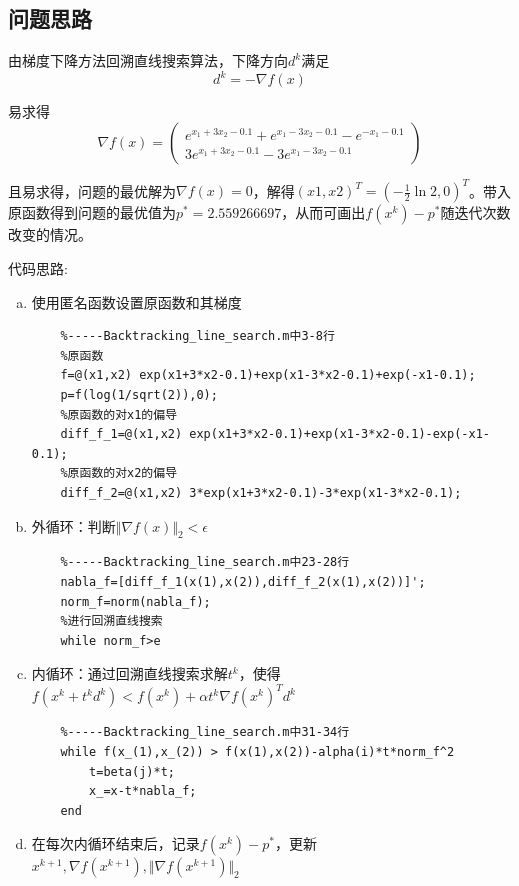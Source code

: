 \documentclass{article}
\begin{document}
\subsection{问题思路}
由梯度下降方法回溯直线搜索算法，下降方向$d^k$满足
\begin{equation*}
    d^k=-\nabla f(x)
\end{equation*}

易求得
\begin{equation*}
    \nabla f(x)=\left(\begin{array}{c}
        e^{x_1+3x_2-0.1}+e^{x_1-3x_2-0.1}-e^{-x_1-0.1} \\
        3e^{x_1+3x_2-0.1}-3e^{x_1-3x_2-0.1}
    \end{array}\right)
\end{equation*}

且易求得，问题的最优解为$\nabla f(x)=0$，解得$\left(x1,x2\right)^T=\left(-\frac{1}{2}\ln 2,0\right)^T$。带入原函数得到问题的最优值为$p^\ast=2.559266697$，从而可画出$f(x^k)-p^\ast$随迭代次数改变的情况。

代码思路:
\begin{enumerate}[a)]
    \item 使用匿名函数设置原函数和其梯度
    \begin{lstlisting}
    %-----Backtracking_line_search.m中3-8行
    %原函数
    f=@(x1,x2) exp(x1+3*x2-0.1)+exp(x1-3*x2-0.1)+exp(-x1-0.1);
    p=f(log(1/sqrt(2)),0);
    %原函数的对x1的偏导
    diff_f_1=@(x1,x2) exp(x1+3*x2-0.1)+exp(x1-3*x2-0.1)-exp(-x1-0.1);
    %原函数的对x2的偏导
    diff_f_2=@(x1,x2) 3*exp(x1+3*x2-0.1)-3*exp(x1-3*x2-0.1);
    \end{lstlisting}

    \item 外循环：判断$\Vert \nabla f(x) \Vert_2<\epsilon$
    \begin{lstlisting}
    %-----Backtracking_line_search.m中23-28行
    nabla_f=[diff_f_1(x(1),x(2)),diff_f_2(x(1),x(2))]';
    norm_f=norm(nabla_f);    
    %进行回溯直线搜索
    while norm_f>e
    \end{lstlisting}

    \item 内循环：通过回溯直线搜索求解$t^k$，使得$f(x^k+t^kd^k)<f(x^k)+\alpha t^k \nabla f(x^k)^T d^k$
    \begin{lstlisting}
    %-----Backtracking_line_search.m中31-34行
    while f(x_(1),x_(2)) > f(x(1),x(2))-alpha(i)*t*norm_f^2
        t=beta(j)*t;
        x_=x-t*nabla_f;
    end
    \end{lstlisting}
    \item 在每次内循环结束后，记录$f(x^k)-p^\ast$，更新$x^{k+1},\nabla f(x^{k+1}) ,\Vert \nabla f(x^{k+1}) \Vert_2$
\end{enumerate}
\end{document}
